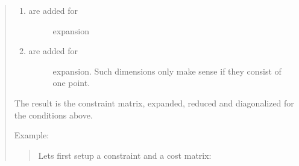 \documentclass[letterpaper,10pt,english]{sphinxmanual}
\begin{document}
\begin{fulllineitems}
\begin{quote}
\begin{enumerate}
\begin{description}
\end{description}

\item {} \begin{description}
\item[{ are added for}] \leavevmode
expansion

\end{description}

\item {} \begin{description}
\item[{ are added for}] \leavevmode
expansion. Such dimensions only make sense if they consist of one point.

\end{description}

\end{enumerate}

The result is the constraint matrix, expanded, reduced and diagonalized for the
conditions above.

Example:
\begin{quote}

Lets first setup a constraint and a cost matrix:


\end{quote}
\end{quote}
\end{fulllineitems}
\end{document}
